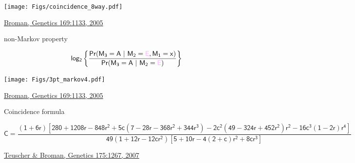 \documentclass[12pt]{article}
\newcommand{\citesize}{\fontsize{14}{18} \selectfont}
\newcommand{\headsize}{\fontsize{35}{35} \selectfont}
\newcommand{\smallsize}{\fontsize{25}{30} \selectfont}
\newcommand{\supersmall}{\fontsize{16}{18} \selectfont}
\begin{document}
{\vspace{15mm}

\centerline{\texttt{[image: Figs/coincidence\_8way.pdf]}}

\vfill

\hfill {\citesize \color{citecolor} \href{http://www.genetics.org/content/169/2/1133.full}{Broman, Genetics
169:1133, 2005}}

\vspace*{5mm}

\newpage


\headsize \color{myyellow}
\hfill \begin{minipage}{5.75in}
\centering
{\color{mypink} non-}Markov property
\end{minipage}

\vspace{15mm}

\color{myblue} \smallsize
$$ \mathsf{log_2 \left\{ \frac{
    Pr(M_3 = A \ | \ M_2 = {\color{mypink} E}, M_1 = x)}{
    Pr(M_3 = A \ | \ M_2 = {\color{mypink} E})}\right\}}$$

\centerline{\texttt{[image: Figs/3pt\_markov4.pdf]}}

\vfill

\hfill {\citesize \color{citecolor} \href{http://www.genetics.org/content/169/2/1133.full}{Broman, Genetics
169:1133, 2005}}

\vspace*{5mm}

\newpage


\headsize \color{myyellow}
\hfill \begin{minipage}{5.75in}
\centering
Coincidence formula
\end{minipage}

\vspace{5cm}

\supersmall \color{mywhite}

$$ \mathsf{C = \frac{(1+6r)[280 + 1208r - 848r^2 + 5c(7-28r - 368r^2 + 344r^3)
  - 2c^2(49 - 324r + 452r^2)r^2 - 16c^3(1-2r)r^4]}{49 (1+12r-12cr^2)
    [5+10r-4(2+c)r^2+8cr^3]} }$$

\vfill

\hfill {\citesize \color{citecolor} \href{http://www.genetics.org/content/175/3/1267.full}{Teuscher \& Broman, Genetics
175:1267, 2007}}

}
\end{document}
